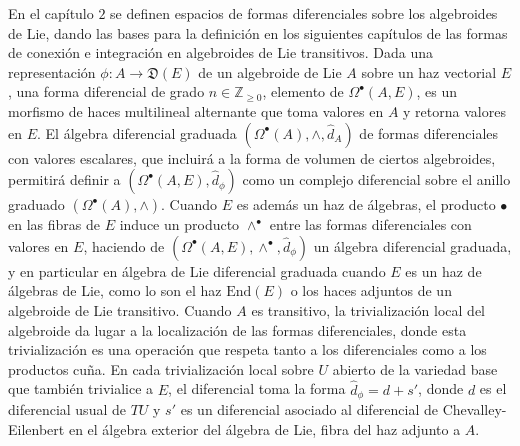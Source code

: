 \documentclass{article}
\begin{document}
En el capítulo $2$ se definen espacios de formas diferenciales sobre los algebroides de Lie, dando las bases para la definición en los siguientes capítulos de las formas de conexión e integración en algebroides de Lie transitivos. Dada una representación $\phi: A \to \mathfrak D(E)$ de un algebroide de Lie $A$ sobre un haz vectorial $E$, una forma diferencial de grado $n \in \mathbb Z_{\geq 0}$, elemento de $\Omega^\bullet(A, E)$, es un morfismo de haces multilineal alternante que toma valores en $A$ y retorna valores en $E$. El álgebra diferencial graduada $(\Omega^\bullet(A), \wedge, \hat d_A)$ de formas diferenciales con valores escalares, que incluirá a la forma de volumen de ciertos algebroides, permitirá definir a $(\Omega^\bullet(A, E), \hat d_\phi)$ como un complejo diferencial sobre el anillo graduado $(\Omega^\bullet(A), \wedge)$. Cuando $E$ es además un haz de álgebras, el producto $\bullet$ en las fibras de $E$ induce un producto $\wedge^\bullet$ entre las formas diferenciales con valores en $E$, haciendo de $(\Omega^\bullet(A, E), \wedge^\bullet, \hat d_\phi)$ un álgebra diferencial graduada, y en particular en álgebra de Lie diferencial graduada cuando $E$ es un haz de álgebras de Lie, como lo son el haz $\text{End}(E)$ o los haces adjuntos de un algebroide de Lie transitivo. Cuando $A$ es transitivo, la trivialización local del algebroide da lugar a la localización de las formas diferenciales, donde esta trivialización es una operación que respeta tanto a los diferenciales como a los productos cuña. En cada trivialización local sobre $U$ abierto de la variedad base que también trivialice a $E$, el diferencial toma la forma $\hat d_\phi = d + s'$, donde $d$ es el diferencial usual de $TU$ y $s'$ es un diferencial asociado al diferencial de Chevalley-Eilenbert en el álgebra exterior del álgebra de Lie, fibra del haz adjunto a $A$.
\end{document}
